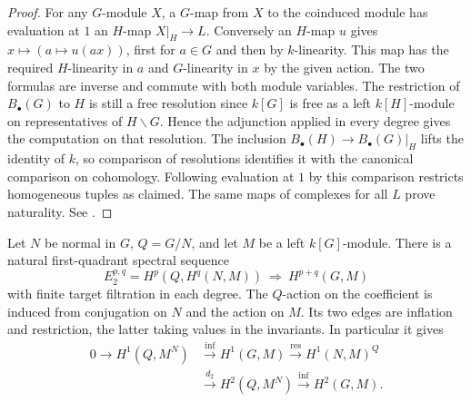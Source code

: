 \begin{proof}
For any \(G\)-module \(X\), a \(G\)-map from \(X\) to the coinduced
module has evaluation at \(1\) an \(H\)-map \(X|_H\to L\). Conversely
an \(H\)-map \(u\) gives \(x\mapsto(a\mapsto u(ax))\), first for
\(a\in G\) and then by \(k\)-linearity. This map has the required
\(H\)-linearity in \(a\) and \(G\)-linearity in \(x\) by the given
action. The two formulas are inverse and commute with both module
variables. The restriction of \(B_\bullet(G)\) to \(H\) is still a
free resolution since \(k[G]\) is free as a left \(k[H]\)-module
on representatives of \(H\backslash G\). Hence the adjunction applied
in every degree gives the computation on that resolution.
The inclusion \(B_\bullet(H)\to B_\bullet(G)|_H\) lifts the
identity of \(k\), so comparison of resolutions
\cite[Chapter 10]{p103} identifies it with the canonical comparison
on cohomology. Following evaluation at \(1\) by this comparison
restricts homogeneous tuples as claimed. The same maps of complexes
for all \(L\) prove naturality. See \cite[Theorem 6.3.2]{weibel}.
\end{proof}

\begin{theorem}
\label{res:A05}
Let \(N\) be normal in \(G\), \(Q=G/N\), and let \(M\) be a left
\(k[G]\)-module. There is a natural first-quadrant spectral sequence
\[
 E_2^{p,q}=H^p(Q,H^q(N,M))\ \Longrightarrow\ H^{p+q}(G,M)
\]
with finite target filtration in each degree. The \(Q\)-action on
the coefficient is induced from conjugation on \(N\) and the action on
\(M\). Its two edges are inflation and restriction, the latter
taking values in the invariants. In particular it gives
\begin{align*}
 0\longrightarrow H^1(Q,M^N)
  &\xrightarrow{\mathrm{inf}}H^1(G,M)
  \xrightarrow{\mathrm{res}} H^1(N,M)^Q\\
  &\xrightarrow{d_2}H^2(Q,M^N)
  \xrightarrow{\mathrm{inf}}H^2(G,M).
\end{align*}
\end{theorem}

